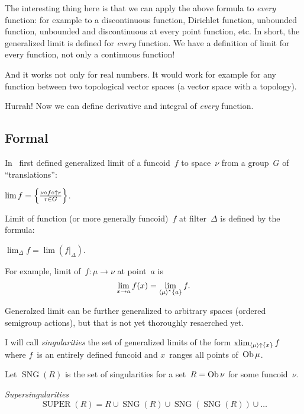 \documentclass{amsart}
\begin{document}
The interesting thing here is that we can apply the above formula to \emph{every} function: for example to a discontinuous function, Dirichlet function, unbounded function, unbounded and discontinuous at every point function, etc. In short, the generalized limit is defined for \emph{every} function. We have a definition of limit for every function, not only a continuous function!

And it works not only for real numbers. It would work for example for any function between two topological vector spaces (a vector space with a topology).

Hurrah! Now we can define derivative and integral of \emph{every} function.

\subsection{Formal}


In~\cite{volume-1-edition1} first defined generalized limit of
a funcoid~$f$ to space~$\nu$ from a group~$G$ of ``translations'':

\begin{defn}
$\lim f=\left\{ \frac{\nu\circ f\circ\uparrow r}{r\in G}\right\}$.
\end{defn}

Limit of function (or more generally funcoid)~$f$ at filter~$\Delta$ is defined by the formula:

\begin{defn}
$\lim_{\Delta} f=\lim(f|_{\Delta})$.
\end{defn}

For example, limit of~$f:\mu\to\nu$ at point~$a$ is
\[ \lim_{x\to a}f(x) = \lim_{\left\langle \mu\right\rangle ^{\ast}\{a\}}f. \]

Generalzed limit can be further generalized to arbitrary spaces
(ordered semigroup actions), but that is not yet thoroughly resaerched yet.

I will call \emph{singularities} the set of generalized limits of the form $\operatorname{xlim}_{\left\langle \mu\right\rangle\uparrow\{x\}}f$ where $f$~is an entirely defined funcoid and $x$~ranges all points of~$\operatorname{Ob}\mu$.

Let $\operatorname{SNG}(R)$ is the set of singularities for
a set~$R=\operatorname{Ob}\nu$ for some funcoid~$\nu$.

\begin{defn}
\emph{Supersingularities}
\[
\operatorname{SUPER}(R) =
R\cup\operatorname{SNG}(R)\cup
\operatorname{SNG}(\operatorname{SNG}(R))\cup\dots
\]
\end{defn}
\end{document}
